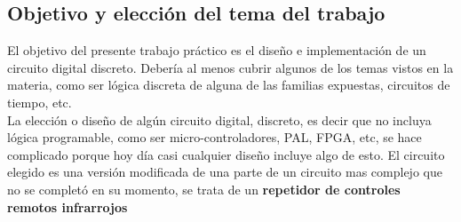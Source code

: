 \subsection{Objetivo y elección del tema del trabajo}

El objetivo del presente trabajo práctico es el diseño e implementación de un circuito digital discreto. Debería al menos cubrir algunos de los temas vistos en la materia, como ser lógica discreta de alguna de las familias expuestas, circuitos de tiempo, etc.\\
La elección o diseño de algún circuito digital, discreto, es decir que no incluya lógica programable, como ser micro-controladores, PAL, FPGA, etc, se hace complicado porque hoy día casi cualquier diseño incluye algo de esto. El circuito elegido es una versión modificada de una parte de un circuito mas complejo que no se completó en su momento, se trata de un \textbf{repetidor de controles remotos infrarrojos}
